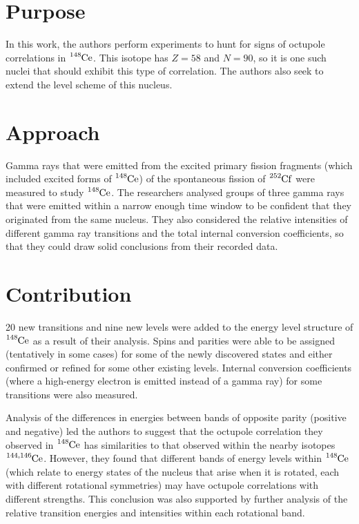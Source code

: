 \documentclass[12pt,a4paper]{article}
\begin{document}
\section*{Purpose}
In this work, the authors perform experiments to hunt for signs of octupole correlations in $\ce{^{148}Ce}$. This isotope has $Z = 58$ and $N = 90$, so it is one such nuclei that should exhibit this type of correlation. The authors also seek to extend the level scheme of this nucleus.


\section*{Approach}
Gamma rays that were emitted from the excited primary fission fragments (which included excited forms of $\ce{^{148}Ce}$) of the spontaneous fission of $\ce{^{252}Cf}$ were measured to study $\ce{^{148}Ce}$. The researchers analysed groups of three gamma rays that were emitted within a narrow enough time window to be confident that they originated from the same nucleus. They also considered the relative intensities of different gamma ray transitions and the total internal conversion coefficients, so that they could draw solid conclusions from their recorded data.

\section*{Contribution}
20 new transitions and nine new levels were added to the energy level structure of $\ce{^{148}Ce}$ as a result of their analysis. Spins and parities were able to be assigned (tentatively in some cases) for some of the newly discovered states and either confirmed or refined for some other existing levels. Internal conversion coefficients (where a high-energy electron is emitted instead of a gamma ray) for some transitions were also measured. 

\medskip
Analysis of the differences in energies between bands of opposite parity (positive and negative) led the authors to suggest that the octupole correlation they observed in $\ce{^{148}Ce}$ has similarities to that observed within the nearby isotopes $\ce{^{144,146}Ce}$. However, they found that different bands of energy levels within $\ce{^{148}Ce}$ (which relate to energy states of the nucleus that arise when it is rotated, each with different rotational symmetries) may have octupole correlations with different strengths. This conclusion was also supported by further analysis of the relative transition energies and intensities within each rotational band. 
\end{document}
